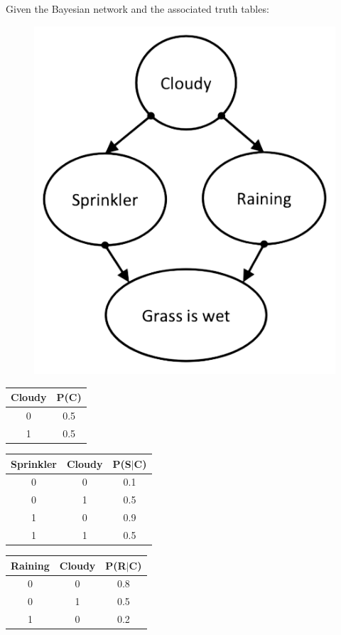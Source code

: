 \documentclass[12pt, a4paper]{report}
\begin{document}
    \begin{example}
        Given the Bayesian network and the associated truth tables:
        \begin{figure}[H]
            \centering
            \includegraphics[width=0.3\linewidth]{images/sprinkler.png}
        \end{figure}
        \begin{table}[H]
            \centering
            \begin{tabular}{cc}
            \hline
            \textbf{Cloudy} & \textbf{P(C)} \\ \hline
            0      & 0.5  \\
            1      & 0.5  \\ \hline
            \end{tabular}
        \end{table}
        \begin{table}[H]
            \centering
            \begin{tabular}{ccc}
            \hline
            \textbf{Sprinkler} & \textbf{Cloudy} & \textbf{P(S$|$C)} \\ \hline
            0         & 0      & 0.1  \\
            0         & 1      & 0.5  \\
            1         & 0      & 0.9  \\
            1         & 1      & 0.5  \\ \hline
            \end{tabular}
        \end{table}
        \begin{table}[H]
            \centering
            \begin{tabular}{ccc}
            \hline
            \textbf{Raining} & \textbf{Cloudy} & \textbf{P(R$|$C)} \\ \hline
            0       & 0      & 0.8    \\
            0       & 1      & 0.5    \\
            1       & 0      & 0.2    \\

\end{tabular}
\end{table}
\end{example}
\end{document}
